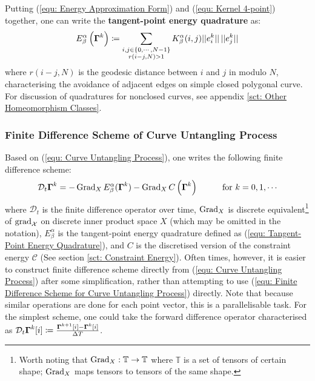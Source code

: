 \documentclass[../dissertation.tex]{subfiles}
\begin{document}
Putting (\ref{equ: Energy Approximation Form}) and (\ref{equ: Kernel 4-point}) together,
one can write the \textbf{tangent-point energy quadrature} as:
\begin{equation}
    E_{\beta}^{\alpha} \left( \boldsymbol{\Gamma}^k \right) \coloneqq \sum_{\substack{i, j \in \left\{ 0, \cdots, N-1 \right\} \\ r \left( i-j,N \right) > 1}} K_{\beta}^{\alpha} (i,j) \lvert \lvert e_i^k \rvert \rvert \, \lvert \lvert e_j^k \rvert \rvert
    \label{equ: Tangent-Point Energy Quadrature}
\end{equation}
where $r\left( i-j,N \right)$ is the geodesic distance between $i$ and $j$ in modulo $N$,
characterising the avoidance of adjacent edges on simple closed polygonal curve.
For discussion of quadratures for nonclosed curves, see appendix \ref{sct: Other Homeomorphism Classes}.


\subsubsection{Finite Difference Scheme of Curve Untangling Process}
Based on (\ref{equ: Curve Untangling Process}), one writes the following finite difference scheme:
\begin{equation}
    \mathcal{D}_{t} \Gammabf^{k} = -\Grad_{X} E_{\beta}^{\alpha} (\Gammabf^k) - \Grad_{X} C \left( \Gammabf^k \right) \hspace{1cm} \text{for } k=0,1,\cdots
    \label{equ: Finite Difference Scheme for Curve Untangling Process}
\end{equation}
where $\mathcal{D}_t$ is the finite difference operator over time,
$\operatorname{Grad}_{X}$ is discrete equivalent\footnote{Worth noting that $\operatorname{Grad}_X:\mathbb{T} \rightarrow \mathbb{T}$ where $\mathbb{T}$ is a set of tensors of certain shape; $\operatorname{Grad}_X$ maps tensors to tensors of the same shape.}  of $\operatorname{grad}_{\mathcal{X}}$ on discrete inner product space $X$ (which may be omitted in the notation),
$E_{\beta}^{\alpha}$ is the tangent-point energy quadrature defined as (\ref{equ: Tangent-Point Energy Quadrature}),
and $C$ is the discretised version of the constraint energy $\mathcal{C}$ (See section \ref{sct: Constraint Energy}).
Often times, however, it is easier to construct finite difference scheme directly from (\ref{equ: Curve Untangling Process}) after some simplification,
rather than attempting to use (\ref{equ: Finite Difference Scheme for Curve Untangling Process}) directly.
Note that because similar operations are done for each point vector, this is a parallelisable task.
For the simplest scheme, one could take the forward difference operator characterised as $\mathcal{D}_t \boldsymbol{\Gamma}^k[i] \coloneqq \frac{\boldsymbol{\Gamma}^{k+1}[i] - \boldsymbol{\Gamma}^{k}[i]}{\Delta T}$.
\end{document}
